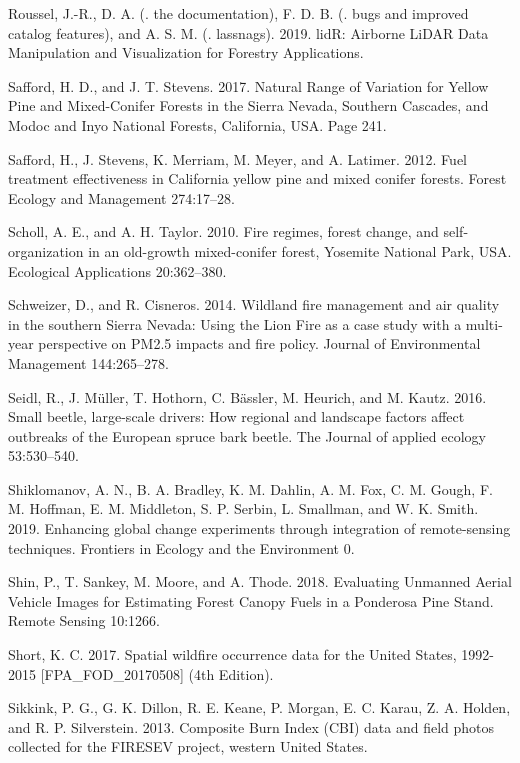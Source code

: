 \documentclass[twoside,12pt,final]{ucthesis-CA2012}
\begin{document}
\begin{ucmainmatter}
\hypertarget{ref-roussel2019}{}
Roussel, J.-R., D. A. (. the documentation), F. D. B. (. bugs and
improved catalog features), and A. S. M. (. lassnags). 2019. lidR:
Airborne LiDAR Data Manipulation and Visualization for Forestry
Applications.

\hypertarget{ref-safford2017}{}
Safford, H. D., and J. T. Stevens. 2017. Natural Range of Variation for
Yellow Pine and Mixed-Conifer Forests in the Sierra Nevada, Southern
Cascades, and Modoc and Inyo National Forests, California, USA. Page
241.

\hypertarget{ref-safford2012}{}
Safford, H., J. Stevens, K. Merriam, M. Meyer, and A. Latimer. 2012.
Fuel treatment effectiveness in California yellow pine and mixed conifer
forests. Forest Ecology and Management 274:17--28.

\hypertarget{ref-scholl2010}{}
Scholl, A. E., and A. H. Taylor. 2010. Fire regimes, forest change, and
self-organization in an old-growth mixed-conifer forest, Yosemite
National Park, USA. Ecological Applications 20:362--380.

\hypertarget{ref-schweizer2014}{}
Schweizer, D., and R. Cisneros. 2014. Wildland fire management and air
quality in the southern Sierra Nevada: Using the Lion Fire as a case
study with a multi-year perspective on PM2.5 impacts and fire policy.
Journal of Environmental Management 144:265--278.

\hypertarget{ref-seidl2016a}{}
Seidl, R., J. Müller, T. Hothorn, C. Bässler, M. Heurich, and M. Kautz.
2016. Small beetle, large-scale drivers: How regional and landscape
factors affect outbreaks of the European spruce bark beetle. The Journal
of applied ecology 53:530--540.

\hypertarget{ref-shiklomanov2019}{}
Shiklomanov, A. N., B. A. Bradley, K. M. Dahlin, A. M. Fox, C. M. Gough,
F. M. Hoffman, E. M. Middleton, S. P. Serbin, L. Smallman, and W. K.
Smith. 2019. Enhancing global change experiments through integration of
remote-sensing techniques. Frontiers in Ecology and the Environment 0.

\hypertarget{ref-shin2018}{}
Shin, P., T. Sankey, M. Moore, and A. Thode. 2018. Evaluating Unmanned
Aerial Vehicle Images for Estimating Forest Canopy Fuels in a Ponderosa
Pine Stand. Remote Sensing 10:1266.

\hypertarget{ref-short2017}{}
Short, K. C. 2017. Spatial wildfire occurrence data for the United
States, 1992-2015 {[}FPA\_FOD\_20170508{]} (4th Edition).

\hypertarget{ref-sikkink2013}{}
Sikkink, P. G., G. K. Dillon, R. E. Keane, P. Morgan, E. C. Karau, Z. A.
Holden, and R. P. Silverstein. 2013. Composite Burn Index (CBI) data and
field photos collected for the FIRESEV project, western United States.


\end{ucmainmatter}
\end{document}

